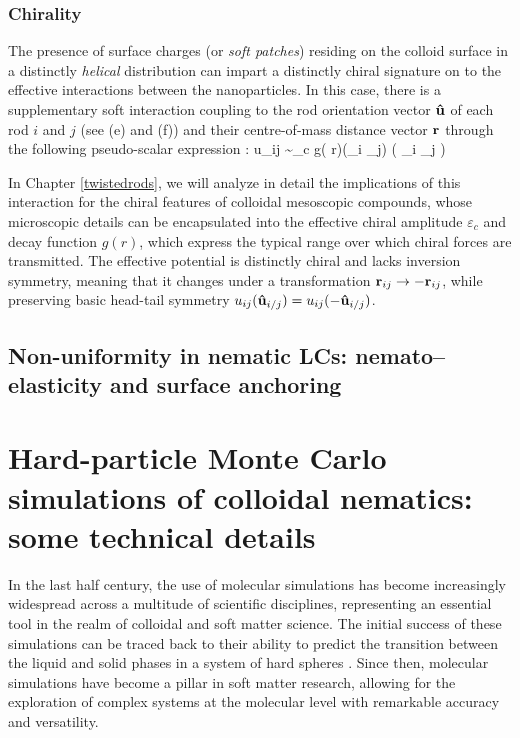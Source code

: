 \subsubsection{Chirality}

The presence of surface charges (or {\em soft patches}) residing on the colloid surface in a distinctly {\em helical} distribution can impart a distinctly chiral signature on to the effective interactions between the nanoparticles. In this case, there is a supplementary soft interaction coupling to the rod orientation vector ${\bf \hat{u}}$ of each rod $i$ and $j$ (see  (e) and (f)) and their centre-of-mass distance vector $\bf r$ through the following pseudo-scalar expression \cite{goossens1971}:
\beq
u_{ij} \sim  \varepsilon_{c} g( r)({\bf {}}_{i} _{j}) ( {\bf {}}_{i} _{j}  )
\label{chirality}
\eeq

In Chapter \ref{twistedrods}, we will analyze in detail the implications of this interaction for the chiral features of colloidal mesoscopic compounds, whose microscopic details can be encapsulated into the effective chiral amplitude $\varepsilon_c$ and decay function $g(r)$, which express the typical range over which chiral forces are transmitted. The effective potential is distinctly chiral and lacks inversion symmetry, meaning that it changes under a transformation ${\bf r}_{ij} \rightarrow -{\bf r}_{ij} $, while preserving basic head-tail symmetry $u_{ij}({\bf \hat{u}}_{i/j}) = u_{ij}(-{\bf \hat{u}}_{i/j}) $.

\subsection{Non-uniformity in nematic LCs: nemato--elasticity and surface anchoring}
\label{nemelasticity}





\section[HPMC simulations of colloidal nematics]{Hard-particle Monte Carlo simulations of colloidal nematics: some technical details}

In the last half century, the use of molecular simulations has become increasingly widespread across a multitude of scientific disciplines, representing an essential tool in the realm of colloidal and soft matter science. The initial success of these simulations can be traced back to their ability to predict the transition between the liquid and solid phases in a system of hard spheres \cite{ALDER57,WOOD57}. Since then, molecular simulations have become a pillar in soft matter research, allowing for the exploration of complex systems at the molecular level with remarkable accuracy and versatility.

